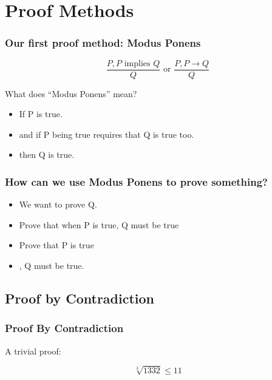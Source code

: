 \section{Proof Methods}

\frame{\tableofcontents[currentsection,hideallsubsections, firstsection=2, sections={2-5}]}

\begin{frame}
  \frametitle{Our first proof method: Modus Ponens}

  \begin{equation*}
    \frac{P, P \text{ implies } Q}{Q}\text{ or } \frac{P, P\rightarrow Q}{Q}
  \end{equation*}

  \vfill

  \begin{block}{What does ``Modus Ponens'' mean?}

    \begin{itemize}
    \item If P is true.
    \item and if P being true \alert{requires} that Q is true
      too.
    \item then Q is true.
    \end{itemize}
  \end{block}

\end{frame}

\begin{frame}
  \frametitle{How can we use Modus Ponens to prove something?}
  \begin{itemize}
  \item We want to prove Q.
  \item Prove that when P is true, Q \alert{must} be true
  \item Prove that P is true
  \item {}, Q must be true.
  \end{itemize}
\end{frame}

\subsection{Proof by Contradiction}
\begin{frame}
  \frametitle{Proof By Contradiction}

  A trivial proof:

  \begin{equation*}
    \sqrt[3]{1332} \leq 11
  \end{equation*}

\end{frame}

